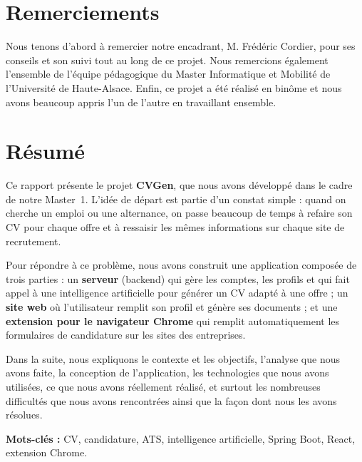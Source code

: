 \documentclass[12pt,a4paper]{report}
\begin{document}
\chapter*{Remerciements}

Nous tenons d'abord \`a remercier notre encadrant, M. Fr\'ed\'eric Cordier, pour
ses conseils et son suivi tout au long de ce projet. Nous remercions \'egalement
l'ensemble de l'\'equipe p\'edagogique du Master Informatique et Mobilit\'e de
l'Universit\'e de Haute-Alsace. Enfin, ce projet a \'et\'e r\'ealis\'e en bin\^ome et
nous avons beaucoup appris l'un de l'autre en travaillant ensemble.

\chapter*{R\'esum\'e}

Ce rapport pr\'esente le projet \textbf{CVGen}, que nous avons d\'evelopp\'e dans le
cadre de notre Master~1. L'id\'ee de d\'epart est partie d'un constat simple : quand
on cherche un emploi ou une alternance, on passe beaucoup de temps \`a refaire son
CV pour chaque offre et \`a ressaisir les m\^emes informations sur chaque site de
recrutement.

Pour r\'epondre \`a ce probl\`eme, nous avons construit une application compos\'ee de
trois parties : un \textbf{serveur} (backend) qui g\`ere les comptes, les profils et
qui fait appel \`a une intelligence artificielle pour g\'en\'erer un CV adapt\'e \`a une
offre ; un \textbf{site web} o\`u l'utilisateur remplit son profil et g\'en\`ere ses
documents ; et une \textbf{extension pour le navigateur Chrome} qui remplit
automatiquement les formulaires de candidature sur les sites des entreprises.

Dans la suite, nous expliquons le contexte et les objectifs, l'analyse que nous
avons faite, la conception de l'application, les technologies que nous avons
utilis\'ees, ce que nous avons r\'eellement r\'ealis\'e, et surtout les nombreuses
difficult\'es que nous avons rencontr\'ees ainsi que la fa\c{c}on dont nous les avons
r\'esolues.

\vspace{4pt}
\textbf{Mots-cl\'es :} CV, candidature, ATS, intelligence artificielle,
Spring Boot, React, extension Chrome.
\end{document}
